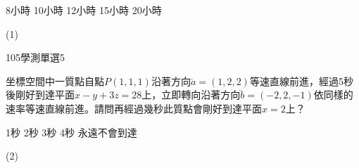 \begin{QUESTIONS}
\begin{QUESTION}
\begin{QBODY}
			\begin{QOPS}
				\QOP 8小時	
				\QOP 10小時	
				\QOP 12小時	
				\QOP 15小時	
				\QOP 20小時
			\end{QOPS}
        \end{QBODY}
        \begin{QFROMS}
        \end{QFROMS}
        \begin{QTAGS}\end{QTAGS}
        \begin{QANS}
            (1)
        \end{QANS}
        \begin{QSOLLIST}
        \end{QSOLLIST}
        \begin{QEMPTYSPACE}
        \end{QEMPTYSPACE}
    \end{QUESTION}
    \begin{QUESTION}
        \begin{ExamInfo}{105}{學測}{單選}{5}
        \end{ExamInfo}
        \begin{ExamAnsRateInfo}{52}{86}{49}{21}
        \end{ExamAnsRateInfo}
        \begin{QBODY}
			坐標空間中一質點自點$P(1,1,1)$沿著方向$\lvec{a}=(1,2,2)$等速直線前進，經過5秒後剛好到達平面$x-y+3z=28$上，立即轉向沿著方向$\lvec{b}=(-2,2,-1)$依同樣的速率等速直線前進。請問再經過幾秒此質點會剛好到達平面$x=2$上？
			\begin{QOPS}
				\QOP 1秒
				\QOP 2秒
				\QOP 3秒
				\QOP 4秒
				\QOP 永遠不會到達
			\end{QOPS}
        \end{QBODY}
        \begin{QFROMS}
        \end{QFROMS}
        \begin{QTAGS}\end{QTAGS}
        \begin{QANS}
            (2)
        \end{QANS}
        \begin{QSOLLIST}
        \end{QSOLLIST}
        \begin{QEMPTYSPACE}
        \end{QEMPTYSPACE}
    \end{QUESTION}
    \begin{QUESTION}

\end{QUESTION}
\end{QUESTIONS}
